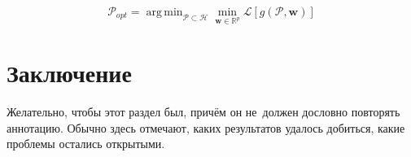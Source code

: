 \documentclass[12pt,twoside]{article}
\DeclareMathOperator*{\argmin}{arg\,min}
\begin{document}
\begin{equation}
\mathbf{\mathcal{P}}_{opt} = \argmin_{\mathcal{P}\subset \mathcal{H}} \min_{\mathbf{w} \in \mathbb{R}^p}\mathcal{L}\left[g(\mathcal{P}, \mathbf{w})\right]
\end{equation}


\section{Заключение}
Желательно, чтобы этот раздел был, причём он не~должен дословно повторять аннотацию.
Обычно здесь отмечают,
каких результатов удалось добиться,
какие проблемы остались открытыми.






\end{document}
